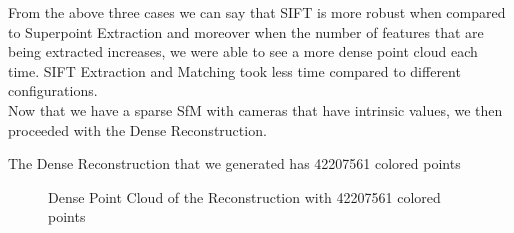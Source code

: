 \documentclass[sigconf]{acmart}
\begin{document}
From the above three cases we can say that SIFT is more robust when compared to Superpoint Extraction and moreover when the number of features that are being extracted increases, we were able to see a more dense point cloud each time. SIFT Extraction and Matching took less time compared to different configurations.
\\ Now that we have a sparse SfM with cameras that have intrinsic values, we then proceeded with the Dense Reconstruction.

The Dense Reconstruction that we generated has 42207561 colored points
\begin{figure}[H]%
    \centering
    \qquad
    \qquad
    \caption{Dense Point Cloud of the Reconstruction with 42207561 colored points}
    \label{fig:Dense}%
\end{figure}
\end{document}
